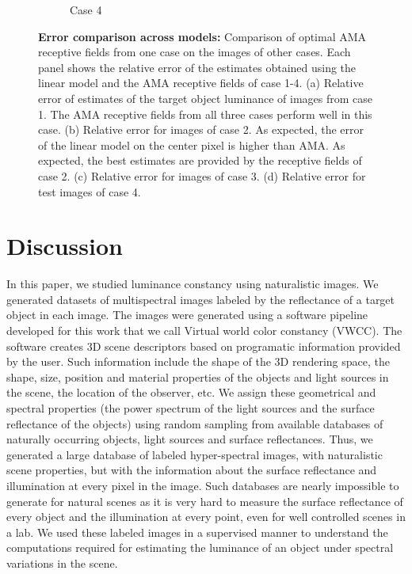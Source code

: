 \documentclass{jov}
\begin{document}
\begin{figure}
\begin{subfigure}{0.22 \textwidth}
	\caption{Case 4}
	\label{fig:case4Bar}
    \end{subfigure}
\caption{{\bf Error comparison across models:} Comparison of optimal AMA receptive fields from one case on the images of other cases. Each panel shows the relative error of the estimates obtained using the linear model and the AMA receptive fields of case 1-4. (a) Relative error of estimates of the target object luminance of images from case 1. The AMA receptive fields from all three cases perform well in this case. (b) Relative error for images of case 2. As expected, the error of the linear model on the center pixel is higher than AMA. As expected, the best estimates are provided by the receptive fields of case 2. (c) Relative error for images of case 3. (d) Relative error for test images of case 4.}
 \label{fig:barGraphs}
\end{figure}

\section{Discussion} \label{Discussion}
In this paper, we studied luminance constancy using naturalistic images. We generated datasets of multispectral images labeled by the reflectance of a target object in each image. The images were generated using a software pipeline developed for this work that we call Virtual world color constancy (VWCC). The software creates 3D scene descriptors based on programatic information provided by the user. Such information include the shape of the 3D rendering space, the shape, size, position and material properties of the objects and light sources in the scene, the location of the observer, etc. We assign these geometrical and spectral properties (the power spectrum of the light sources and the surface reflectance of the objects) using random sampling from available databases of naturally occurring objects, light sources and surface reflectances. Thus, we generated a large database of labeled hyper-spectral images, with naturalistic scene properties, but with the information about the surface reflectance and illumination at every pixel in the image. Such databases are nearly impossible to generate for natural scenes as it is very hard to measure the surface reflectance of every object and the illumination at every point, even for well controlled scenes in a lab. We used these labeled images in a supervised manner to understand the computations required for estimating the luminance of an object under spectral variations in the scene.
\end{document}
